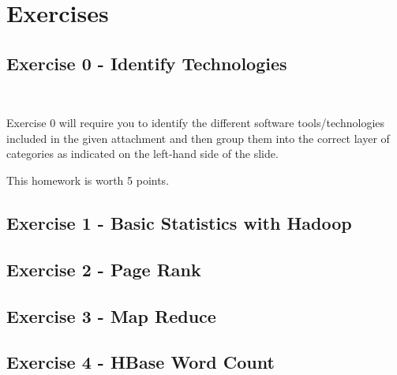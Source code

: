 \part{Exercises}\label{assignments}

\chapter{Exercise 0 - Identify Technologies}\label{assignment-0}

\FILENAME\

Exercise 0 will require you to identify the different software
tools/technologies included in the given attachment and then group them
into the correct layer of categories as indicated on the left-hand side
of the slide.

This homework is worth 5 points.


\chapter{Exercise 1 - Basic Statistics with Hadoop}\label{exercise-1}




\chapter{Exercise 2 - Page Rank}\label{exercise-2}



\chapter{Exercise 3 - Map Reduce}\label{exercise-3}



\chapter{Exercise 4 - HBase Word Count}\label{exercise-4}



% 

